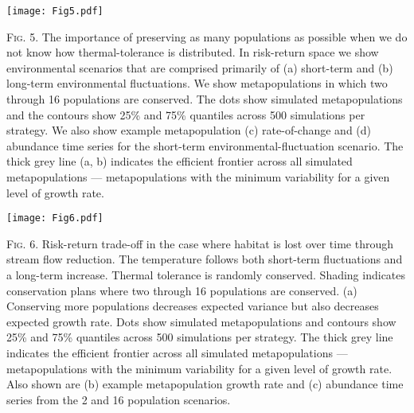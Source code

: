 \documentclass[12pt,english]{article}
\begin{document}
\begin{spacing}{1.3}
\clearpage

\begin{center}
\texttt{[image: Fig5.pdf]}
\end{center}
\bigskip
\noindent
\textsc{Fig. 5}. The importance of preserving as many populations as possible when we do not know how thermal-tolerance is distributed. In risk-return space we show environmental scenarios that are comprised primarily of (a) short-term and (b) long-term environmental fluctuations. We show metapopulations in which two through 16 populations are conserved. The dots show simulated metapopulations and the contours show 25\% and 75\% quantiles across 500 simulations per strategy. We also show example metapopulation (c) rate-of-change and (d) abundance time series for the short-term environmental-fluctuation scenario. The thick grey line (a, b) indicates the efficient frontier across all simulated metapopulations --- metapopulations with the minimum variability for a given level of growth rate.

\begin{center}
\texttt{[image: Fig6.pdf]}
\end{center}
\bigskip
\noindent
\textsc{Fig. 6}. Risk-return trade-off in the case where habitat is lost over time through stream flow reduction. The temperature follows both short-term fluctuations and a long-term increase. Thermal tolerance is randomly conserved. Shading indicates conservation plans where two through 16 populations are conserved. (a) Conserving more populations decreases expected variance but also decreases expected growth rate. Dots show simulated metapopulations and contours show 25\% and 75\% quantiles across 500 simulations per strategy. The thick grey line indicates the efficient frontier across all simulated metapopulations --- metapopulations with the minimum variability for a given level of growth rate. Also shown are (b) example metapopulation growth rate and (c) abundance time series from the 2 and 16 population scenarios.

\clearpage



\end{spacing}


\begin{spacing}{1.1}

%

\end{spacing}
\end{document}
